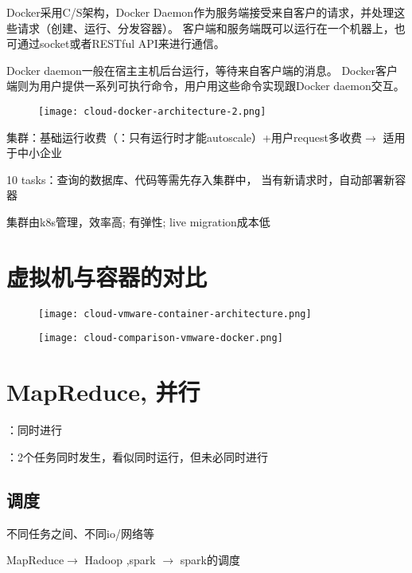 Docker采用C/S架构，Docker Daemon作为服务端接受来自客户的请求，并处理这些请求（创建、运行、分发容器）。 客户端和服务端既可以运行在一个机器上，也可通过socket或者RESTful API来进行通信。 

Docker daemon一般在宿主主机后台运行，等待来自客户端的消息。 Docker客户端则为用户提供一系列可执行命令，用户用这些命令实现跟Docker daemon交互。 

\begin{figure}[htbp]
    \centering
    \texttt{[image: cloud-docker-architecture-2.png]}
\end{figure}

\begin{definition}[Cluster]

\end{definition}

集群：基础运行收费（：只有运行时才能autoscale）+用户request多收费$\rightarrow$ 适用于中小企业

\begin{example}
    10 tasks：查询的数据库、代码等需先存入️集群中， 
当有新请求时，️自动部署新容器
\end{example}

集群由k8s管理，效率高; 有弹性; live migration成本低

\section{虚拟机与容器的对比}


\begin{figure}[htbp]
    \texttt{[image: cloud-vmware-container-architecture.png]}
\end{figure}

\begin{figure}[htbp]
    \texttt{[image: cloud-comparison-vmware-docker.png]}
\end{figure}

\section{MapReduce, 并行}

：同时进行

：2个任务同时发生，看似同时运行，但未必同时进行

\subsection{调度}

不同任务之间、不同io/网络等

MapReduce$\rightarrow$ Hadoop ,spark $\rightarrow$ spark的调度